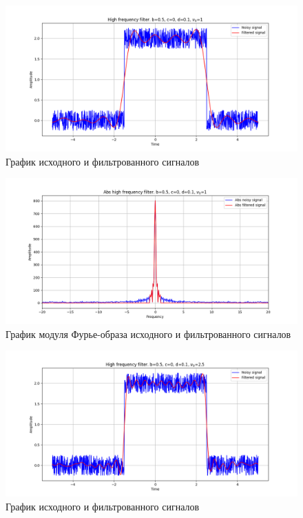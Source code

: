 \documentclass[a4paper, 12pt]{article}
\begin{document}
    \begin{figure}[!htb]
        \centering
        \includegraphics[scale=0.485]{12_u_flt_u_nohigh.png}
        \captionsetup{skip=0pt}
        \caption{График исходного и фильтрованного сигналов}
        \label{fig:fig13}
    \end{figure}
    \begin{figure}[!htb]
        \centering
        \includegraphics[scale=0.485]{12_abs_u_U_nohigh.png}
        \captionsetup{skip=0pt}
        \caption{График модуля Фурье-образа исходного и фильтрованного сигналов}
        \label{fig:fig14}
    \end{figure}
    \begin{figure}[!htb]
        \centering
        \includegraphics[scale=0.485]{13_u_flt_u_nohigh.png}
        \captionsetup{skip=0pt}
        \caption{График исходного и фильтрованного сигналов}
        \label{fig:fig15}
    \end{figure}
\end{document}
